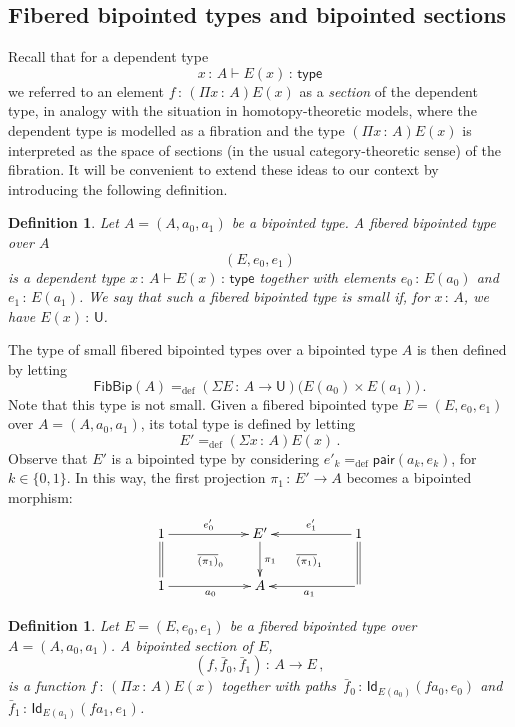 \documentclass[10pt,a4paper,oneside,reqno]{amsart}
\numberwithin{equation}{section}
\theoremstyle{mythm}
\theoremstyle{mydef}
\newtheorem{definition}[theorem]{Definition}
\theoremstyle{myrmk}
\newcommand{\defeq}{=_{\mathrm{def}}}
\newcommand{\co}{\,{:}\,}
\newcommand{\type}{\mathsf{type}}
\newcommand{\Id}{\mathsf{Id}}
\newcommand{\pair}{\mathsf{pair}}
\newcommand{\U}{\mathsf{U}}
\newcommand{\FibBip}{\mathsf{FibBip}}
\begin{document}
\subsection{Fibered bipointed types and bipointed sections} Recall that for a dependent type
\[
 x \co A \vdash E(x) \co \type
\]
we referred to an element $f \co (\Pi x \co A) E(x)$ as a \emph{section} of the dependent type,
in analogy with the situation in homotopy-theoretic models, where the dependent type is modelled
as a fibration and the type $(\Pi x \co A)E(x)$ is interpreted as the space of sections (in the usual
category-theoretic sense) of the fibration. It will be convenient to extend these ideas to our 
context by introducing the following definition. 


\begin{definition} \label{def:fibbipointed}
Let $A = (A, a_0, a_1)$ be a bipointed type. A \emph{fibered bipointed type over $A$}
\[
(E, e_0, e_1)
\]  
is a dependent type $x \co A \vdash E(x) \co \type$ together with elements $e_0 \co E(a_0)$ and $e_1 \co E(a_1)$.
We say that  such a fibered bipointed type  is \emph{small} if, for
$x \co A$, we have $E(x) \co \U$.  
\end{definition}

The type of  small fibered bipointed types over a bipointed type $A$ is then defined by letting
\[
\FibBip(A) \defeq (\Sigma E \co A \to \U) \big( E(a_0) \times E(a_1) \big) \, .
 \]
 Note that this type is not small. Given a fibered bipointed type $E =(E, e_0, e_1)$ over $A = (A, a_0, a_1)$, its total type is defined by letting
\[
E'  \defeq (\Sigma x \co A) E(x) \, .
\] 
Observe that $E'$ is a bipointed type by considering $e'_k \defeq \pair(a_k, e_k)$, 
for $k \in \{ 0, 1 \}$. In this way, the first projection $\pi_1 \co E' \to A$ becomes a bipointed morphism:
\[
\xymatrix@C=2cm{
1  \ar[r]^-{e'_0} \ar@{=}[d] \ar@{}[dr]|{\overline{(\pi_1)}_0} & E' \ar[d]^{\pi_1} & 1 \ar[l]_-{e'_1} \ar@{=}[d]
\ar@{}[dl]|{\overline{(\pi_1)}_1}   \\ 
 1 \ar[r]_{a_0} & A  &  \ar[l]^{a_1} }
 \]




\begin{definition} \label{def:fibsection} Let $E = (E, e_0, e_1)$ be a fibered bipointed type over
$A = (A, a_0, a_1)$.  A \emph{bipointed section} of $E$, 
\[
(f, \bar{f}_0, \bar{f}_1) \co A \to E \, ,
\]
is a function $f \co (\Pi x \co A) E(x)$ together with paths~$\bar{f}_0 \co \Id_{E(a_0)}(f a_0, e_0)$ 
and $\bar{f}_1 \co  \Id_{E(a_1)}( f a_1 , e_1)$. 
\end{definition} 
\end{document}
